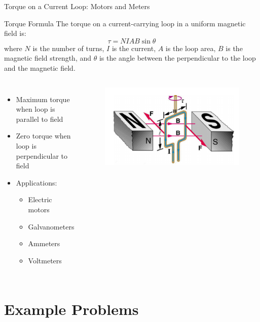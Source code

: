 \documentclass{beamer}
\begin{document}
\begin{frame}{Torque on a Current Loop: Motors and Meters}
\begin{block}{Torque Formula}
The torque on a current-carrying loop in a uniform magnetic field is:
\begin{equation}
\tau = NIAB\sin\theta
\end{equation}
where $N$ is the number of turns, $I$ is the current, $A$ is the loop area, $B$ is the magnetic field strength, and $\theta$ is the angle between the perpendicular to the loop and the magnetic field.
\end{block}

\begin{columns}
\begin{itemize}
\item Maximum torque when loop is parallel to field
\item Zero torque when loop is perpendicular to field
\item Applications:
  \begin{itemize}
  \item Electric motors
  \item Galvanometers
  \item Ammeters
  \item Voltmeters
  \end{itemize}
\end{itemize}

\begin{figure}
    \centering
    \includegraphics[width=0.9\linewidth]{mgtrq.png}
\end{figure}
\end{columns}
\end{frame}

\section{Example Problems}
\end{document}
